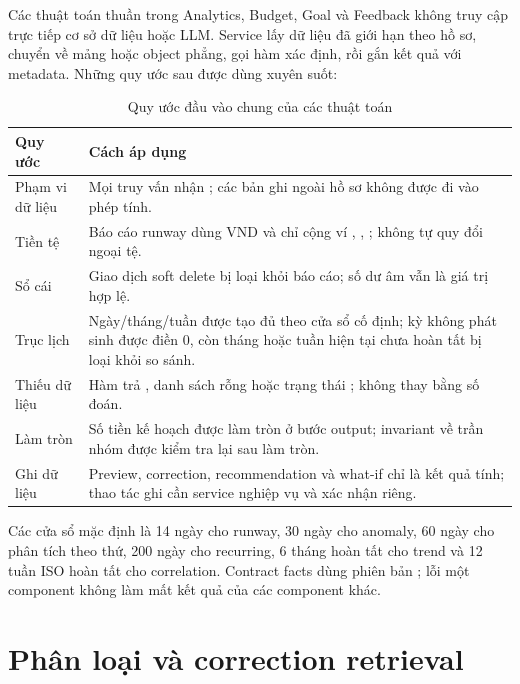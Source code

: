 Các thuật toán thuần trong Analytics, Budget, Goal và Feedback không truy cập trực tiếp cơ sở dữ liệu hoặc LLM. Service lấy dữ liệu đã giới hạn theo hồ sơ, chuyển về mảng hoặc object phẳng, gọi hàm xác định, rồi gắn kết quả với metadata. Những quy ước sau được dùng xuyên suốt:

\begin{table}[H]
  \centering
  \caption{Quy ước đầu vào chung của các thuật toán}
  \label{tab:app-conventions}
  \begin{tabularx}{\textwidth}{@{}L{3.7cm}Y@{}}
    \toprule
    \textbf{Quy ước} & \textbf{Cách áp dụng} \\
    \midrule
    Phạm vi dữ liệu & Mọi truy vấn nhận ; các bản ghi ngoài hồ sơ không được đi vào phép tính. \\
    Tiền tệ & Báo cáo runway dùng VND và chỉ cộng ví , , ; không tự quy đổi ngoại tệ. \\
    Sổ cái & Giao dịch soft delete bị loại khỏi báo cáo; số dư âm vẫn là giá trị hợp lệ. \\
    Trục lịch & Ngày/tháng/tuần được tạo đủ theo cửa sổ cố định; kỳ không phát sinh được điền 0, còn tháng hoặc tuần hiện tại chưa hoàn tất bị loại khỏi so sánh. \\
    Thiếu dữ liệu & Hàm trả , danh sách rỗng hoặc trạng thái ; không thay bằng số đoán. \\
    Làm tròn & Số tiền kế hoạch được làm tròn ở bước output; invariant về trần nhóm được kiểm tra lại sau làm tròn. \\
    Ghi dữ liệu & Preview, correction, recommendation và what-if chỉ là kết quả tính; thao tác ghi cần service nghiệp vụ và xác nhận riêng. \\
    \bottomrule
  \end{tabularx}
\end{table}

Các cửa sổ mặc định là 14 ngày cho runway, 30 ngày cho anomaly, 60 ngày cho phân tích theo thứ, 200 ngày cho recurring, 6 tháng hoàn tất cho trend và 12 tuần ISO hoàn tất cho correlation. Contract facts dùng phiên bản ; lỗi một component không làm mất kết quả của các component khác.

\section{Phân loại và correction retrieval}
\label{app:classification-algorithms}

